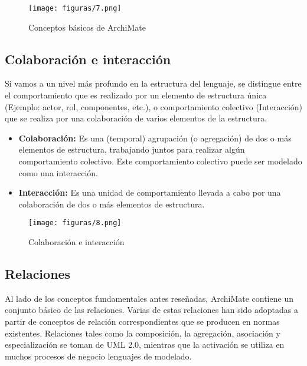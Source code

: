      \begin{figure}[!h]
     	\centering
     	\texttt{[image: figuras/7.png]}
     	\captionsetup{width=.95\textwidth}
     	\caption{Conceptos básicos de ArchiMate}
     	\label{figura7}
     \end{figure}
  
  \subsection{Colaboración e interacción}
  Si vamos a un nivel más profundo en la estructura del lenguaje, se distingue entre el comportamiento que es realizado por un elemento de estructura única (Ejemplo: actor, rol, componentes, etc.), o comportamiento colectivo (Interacción) que se realiza por una colaboración de varios elementos de la estructura.
  
  \begin{itemize}
  	\item \textbf{Colaboración:} Es una (temporal) agrupación (o agregación) de dos o más elementos de estructura, trabajando juntos para realizar algún comportamiento colectivo. Este comportamiento colectivo puede ser modelado como una interacción.
  	\item \textbf{Interacción:} Es una unidad de comportamiento llevada a cabo por una colaboración de dos o más elementos de estructura.
  \end{itemize}
 
  \begin{figure}[!h]
   	\centering
   	\texttt{[image: figuras/8.png]}
   	\captionsetup{width=.95\textwidth}
   	\caption{Colaboración e interacción}
   	\label{figura8}
  \end{figure}
  
  \subsection{Relaciones}
  Al lado de los conceptos fundamentales antes reseñadas, ArchiMate contiene un conjunto básico de las relaciones. Varias de estas relaciones han sido adoptadas a partir de conceptos de relación correspondientes que se producen en normas existentes. Relaciones tales como la composición, la agregación, asociación y especialización se toman de UML 2.0, mientras que la activación se utiliza en muchos procesos de negocio lenguajes de modelado.
  
